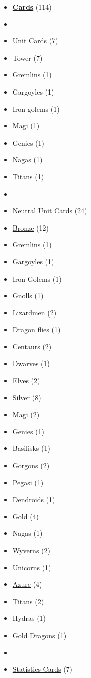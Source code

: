 \begin{multicols}{3}
\begin{itemize}[leftmargin=0pt, label={}, noitemsep, noitemsep]
  \item \textbf{\underline{Cards}} (114)
  \item
  \item \underline{Unit Cards} (7)
  \item Tower (7)
  \item Gremlins (1)
  \item Gargoyles (1)
  \item Iron golems (1)
  \item Magi (1)
  \item Genies (1)
  \item Nagas (1)
  \item Titans (1)
  \item
  \item \underline{Neutral Unit Cards} (24)
  \item \underline{Bronze} (12)
  \item Gremlins (1)
  \item Gargoyles (1)
  \item Iron Golems (1)
  \item Gnolls (1)
  \item Lizardmen (2)
  \item Dragon flies (1)
  \item Centaurs (2)
  \item Dwarves (1)
  \item Elves (2)
  \item \underline{Silver} (8)
  \item Magi (2)
  \item Genies (1)
  \item Basilisks (1)
  \item Gorgons (2)
  \item Pegasi (1)
  \item Dendroids (1)
  \item \underline{Gold} (4)
  \item Nagas (1)
  \item Wyverns (2)
  \item Unicorns (1)
  \item \underline{Azure} (4)
  \item Titans (2)
  \item Hydras (1)
  \item Gold Dragons (1)
  \item
  \item \underline{Statistics Cards} (7)

\end{itemize}
\end{multicols}
